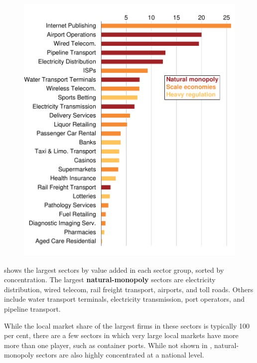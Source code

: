 \begin{figure}
\begin{minipage}[t][\textheight]{\columnwidth}
    \includegraphics[page=2]{atlas/ChartsL}
    \end{minipage}
    \vspace{-56pt}
  \end{figure}

 shows the largest sectors by value added in each sector group, sorted by concentration. The largest \textbf{natural-monopoly} sectors are electricity distribution, wired telecom, rail freight transport, airports, and toll roads. Others include water transport terminals, electricity transmission, port operators, and pipeline transport.%

While the local market share of the largest firms in these sectors is typically 100 per cent, there are a few sectors in which very large local markets have more more than one player, such as container ports. While not shown in , natural-monopoly sectors are also highly concentrated at a national level.

